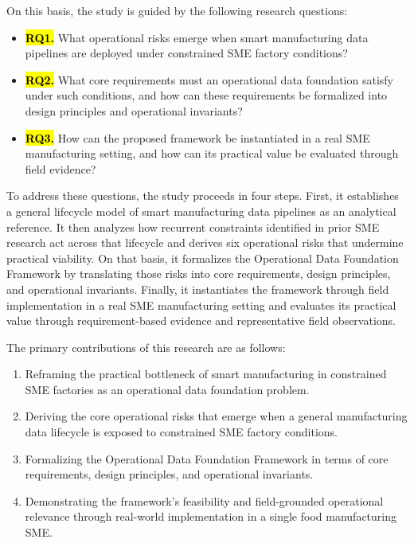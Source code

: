 \documentclass[systems,article,accept,pdftex,moreauthors]{Definitions/mdpi}
\begin{document}
On this basis, the study is guided by the following research questions:

\begin{itemize}
    \item \textbf{\hl{RQ1.} %
} What operational risks emerge when smart manufacturing data pipelines are deployed under constrained SME factory conditions?
    \item \textbf{\hl{RQ2.}} What core requirements must an operational data foundation satisfy under such conditions, and how can these requirements be formalized into design principles and operational invariants?
    \item \textbf{\hl{RQ3.}} How can the proposed framework be instantiated in a real SME manufacturing setting, and how can its practical value be evaluated through field evidence?
\end{itemize}

To address these questions, the study proceeds in four steps. First, it establishes a general lifecycle model of smart manufacturing data pipelines as an analytical reference. It then analyzes how recurrent constraints identified in prior SME research act across that lifecycle and derives six operational risks that undermine practical viability. On that basis, it formalizes the Operational Data Foundation Framework by translating those risks into core requirements, design principles, and operational invariants. Finally, it instantiates the framework through field implementation in a real SME manufacturing setting and evaluates its practical value through requirement-based evidence and representative field observations.

The primary contributions of this research are as follows:

\begin{enumerate}
    \item Reframing the practical bottleneck of smart manufacturing in constrained SME factories as an operational data foundation problem.
    \item Deriving the core operational risks that emerge when a general manufacturing data lifecycle is exposed to constrained SME factory conditions.
    \item Formalizing the Operational Data Foundation Framework in terms of core requirements, design principles, and operational invariants.
    \item Demonstrating the framework's feasibility and field-grounded operational relevance through real-world implementation in a single food manufacturing SME.
\end{enumerate}
\end{document}
